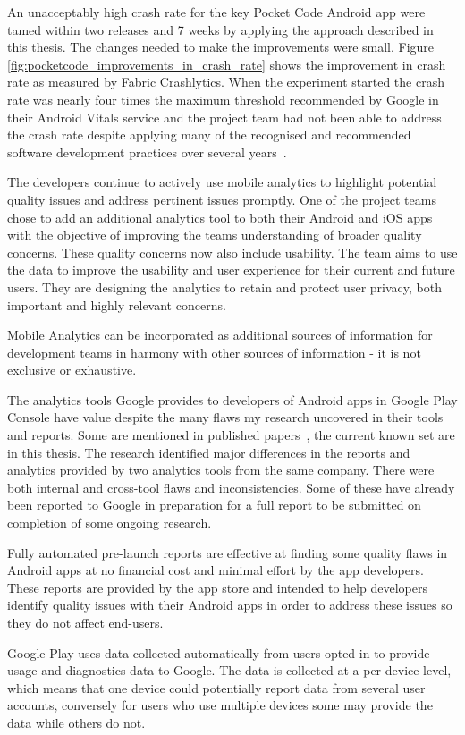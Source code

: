 An unacceptably high crash rate for the key Pocket Code Android app were tamed within two releases and 7 weeks by applying the approach described in this thesis. The changes needed to make the improvements were small. Figure \ref{fig:pocketcode_improvements_in_crash_rate} shows the improvement in crash rate as measured by Fabric Crashlytics. When the experiment started the crash rate was nearly four times the maximum threshold recommended by Google in their Android Vitals service and the project team had not been able to address the crash rate despite applying many of the recognised and recommended software development practices over several years~\cite{adamsen2015systematic_catrobat, luhana2018streamlining, ali2019behavior_catrobat, ali2019using_catrobat, hirsch2019approach_catrobat, schranz2019contributors_catrobat, slany2014tinkering}.

The developers continue to actively use mobile analytics to highlight potential quality issues and address pertinent issues promptly. One of the project teams chose to add an additional analytics tool to both their Android and iOS apps with the objective of improving the teams understanding of broader quality concerns. These quality concerns now also include usability. The team aims to use the data to improve the usability and user experience for their current and future users. They are designing the analytics to retain and protect user privacy, both important and highly relevant concerns.

Mobile Analytics can be incorporated as additional sources of information for development teams in harmony with other sources of information - it is not exclusive or exhaustive.

The analytics tools Google provides to developers of Android apps in Google Play Console have value despite the many flaws my research uncovered in their tools and reports. Some are mentioned in published papers~\cite{harty_google_play_console_insightful_development_using_android_vitals_and_pre_launch_reports, harty_better_android_apps_using_android_vitals, harty_improving_app_quality_despite_flawed_mobile_analytics}, the current known set are in this thesis. The research identified major differences in the reports and analytics provided by two analytics tools from the same company. There were both internal and cross-tool flaws and inconsistencies. Some of these have already been reported to Google in preparation for a full report to be submitted on completion of some ongoing research.

Fully automated pre-launch reports are effective at finding some quality flaws in Android apps at no financial cost and minimal effort by the app developers. These reports are provided by the app store and intended to help developers identify quality issues with their Android apps in order to address these issues so they do not affect end-users.


Google Play uses data collected automatically from users opted-in to provide usage and diagnostics data to Google. The data is collected at a per-device level, which means that one device could potentially report data from several user accounts, conversely for users who use multiple devices some may provide the data while others do not.